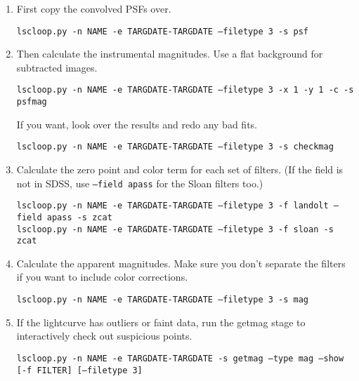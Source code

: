 \begin{enumerate}

\item First copy the convolved PSFs over.

{\tt lscloop.py -n NAME -e TARGDATE-TARGDATE --filetype 3 -s psf}

\item Then calculate the instrumental magnitudes. Use a flat background for subtracted images.

{\tt lscloop.py -n NAME -e TARGDATE-TARGDATE --filetype 3 -x 1 -y 1 -c -s psfmag }

If you want, look over the results and redo any bad fits.

{\tt lscloop.py -n NAME -e TARGDATE-TARGDATE --filetype 3 -s checkmag}

\item Calculate the zero point and color term for each set of filters. (If the field is not in SDSS, use {\tt --field apass} for the Sloan filters too.)

{\tt lscloop.py -n NAME -e TARGDATE-TARGDATE --filetype 3 -f landolt --field apass -s zcat }\\
{\tt lscloop.py -n NAME -e TARGDATE-TARGDATE --filetype 3 -f sloan -s zcat }

\item Calculate the apparent magnitudes. Make sure you don't separate the filters if you want to include color corrections.

{\tt lscloop.py -n NAME -e TARGDATE-TARGDATE --filetype 3 -s mag }

\item If the lightcurve has outliers or faint data, run the getmag stage to interactively check out suspicious points.

{\tt lscloop.py -n NAME -e TARGDATE-TARGDATE -s getmag --type mag --show [-f FILTER] [--filetype 3]}

\end{enumerate}